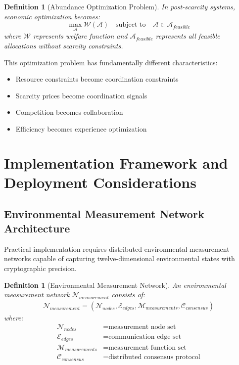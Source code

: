 \documentclass[12pt,a4paper]{article}
\newtheorem{definition}[theorem]{Definition}
\begin{document}
\begin{definition}[Abundance Optimization Problem]
In post-scarcity systems, economic optimization becomes:
\begin{equation}
\max_{\mathcal{A}} \mathcal{W}(\mathcal{A}) \quad \text{subject to} \quad \mathcal{A} \in \mathcal{A}_{feasible}
\end{equation}
where $\mathcal{W}$ represents welfare function and $\mathcal{A}_{feasible}$ represents all feasible allocations without scarcity constraints.
\end{definition}

This optimization problem has fundamentally different characteristics:
\begin{itemize}
\item Resource constraints become coordination constraints
\item Scarcity prices become coordination signals  
\item Competition becomes collaboration
\item Efficiency becomes experience optimization
\end{itemize}

\section{Implementation Framework and Deployment Considerations}

\subsection{Environmental Measurement Network Architecture}

Practical implementation requires distributed environmental measurement networks capable of capturing twelve-dimensional environmental states with cryptographic precision.

\begin{definition}[Environmental Measurement Network]
An environmental measurement network $\mathcal{N}_{measurement}$ consists of:
\begin{align}
\mathcal{N}_{measurement} = (\mathcal{N}_{nodes}, \mathcal{E}_{edges}, \mathcal{M}_{measurements}, \mathcal{C}_{consensus})
\end{align}
where:
\begin{align}
\mathcal{N}_{nodes} &= \text{measurement node set} \\
\mathcal{E}_{edges} &= \text{communication edge set} \\
\mathcal{M}_{measurements} &= \text{measurement function set} \\
\mathcal{C}_{consensus} &= \text{distributed consensus protocol}
\end{align}
\end{definition}
\end{document}

